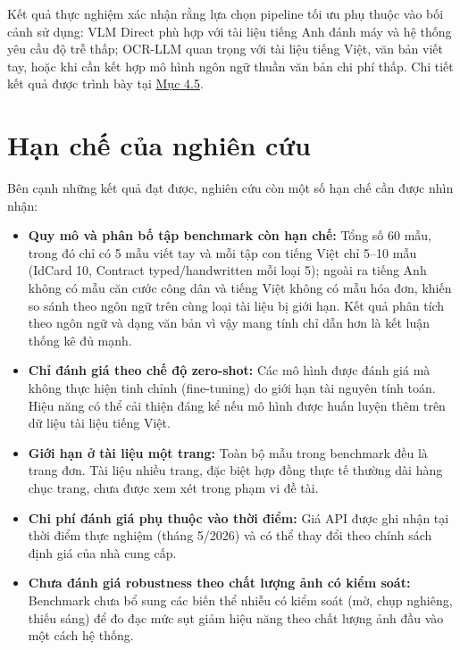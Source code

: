 ﻿\documentclass[12pt]{report}
\begin{document}
Kết quả thực nghiệm xác nhận rằng lựa chọn pipeline tối ưu phụ thuộc vào bối cảnh sử dụng: VLM Direct phù hợp với tài liệu tiếng Anh đánh máy và hệ thống yêu cầu độ trễ thấp; OCR-LLM quan trọng với tài liệu tiếng Việt, văn bản viết tay, hoặc khi cần kết hợp mô hình ngôn ngữ thuần văn bản chi phí thấp. Chi tiết kết quả được trình bày tại \hyperref[sec:results]{Mục 4.5}.

\section{Hạn chế của nghiên cứu}\label{sec:limitations}

Bên cạnh những kết quả đạt được, nghiên cứu còn một số hạn chế cần được nhìn nhận:

\begin{itemize}
    \item \textbf{Quy mô và phân bố tập benchmark còn hạn chế:} Tổng số 60 mẫu, trong đó chỉ có 5 mẫu viết tay và mỗi tập con tiếng Việt chỉ 5--10 mẫu (IdCard 10, Contract typed/handwritten mỗi loại 5); ngoài ra tiếng Anh không có mẫu căn cước công dân và tiếng Việt không có mẫu hóa đơn, khiến so sánh theo ngôn ngữ trên cùng loại tài liệu bị giới hạn. Kết quả phân tích theo ngôn ngữ và dạng văn bản vì vậy mang tính chỉ dẫn hơn là kết luận thống kê đủ mạnh.

    \item \textbf{Chỉ đánh giá theo chế độ zero-shot:} Các mô hình được đánh giá mà không thực hiện tinh chỉnh (fine-tuning) do giới hạn tài nguyên tính toán. Hiệu năng có thể cải thiện đáng kể nếu mô hình được huấn luyện thêm trên dữ liệu tài liệu tiếng Việt.

    \item \textbf{Giới hạn ở tài liệu một trang:} Toàn bộ mẫu trong benchmark đều là trang đơn. Tài liệu nhiều trang, đặc biệt hợp đồng thực tế thường dài hàng chục trang, chưa được xem xét trong phạm vi đề tài.

    \item \textbf{Chi phí đánh giá phụ thuộc vào thời điểm:} Giá API được ghi nhận tại thời điểm thực nghiệm (tháng 5/2026) và có thể thay đổi theo chính sách định giá của nhà cung cấp.

    \item \textbf{Chưa đánh giá robustness theo chất lượng ảnh có kiểm soát:} Benchmark chưa bổ sung các biến thể nhiễu có kiểm soát (mờ, chụp nghiêng, thiếu sáng) để đo đạc mức sụt giảm hiệu năng theo chất lượng ảnh đầu vào một cách hệ thống.
\end{itemize}
\end{document}
